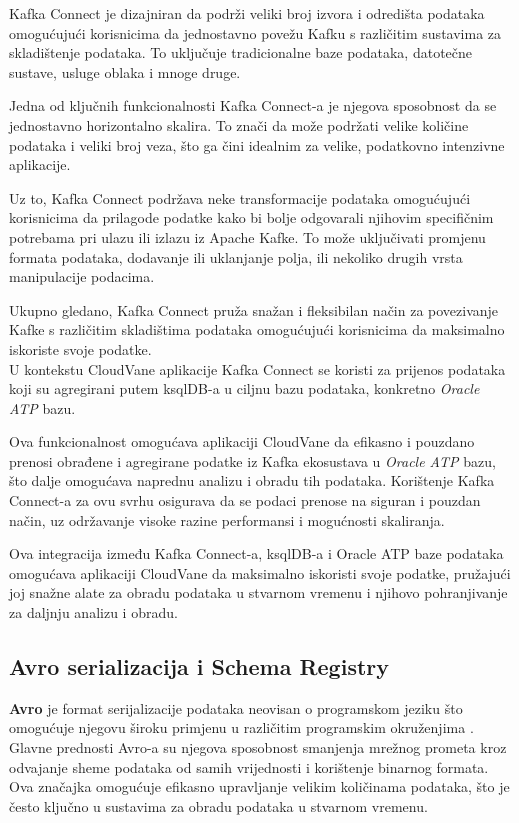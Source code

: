 \documentclass[times, utf8, diplomski]{fer}
\begin{document}
Kafka Connect je dizajniran da podrži veliki broj izvora  i odredišta  podataka omogućujući korisnicima da jednostavno povežu Kafku s različitim sustavima za skladištenje podataka. To uključuje tradicionalne baze podataka, datotečne sustave, usluge oblaka i mnoge druge.

Jedna od ključnih funkcionalnosti Kafka Connect-a je njegova sposobnost da se jednostavno horizontalno skalira. To znači da može podržati velike količine podataka i veliki broj veza, što ga čini idealnim za velike, podatkovno intenzivne aplikacije.

Uz to, Kafka Connect podržava neke transformacije podataka omogućujući korisnicima da prilagode podatke kako bi bolje odgovarali njihovim specifičnim potrebama pri ulazu ili izlazu iz Apache Kafke. To može uključivati promjenu formata podataka, dodavanje ili uklanjanje polja, ili nekoliko drugih vrsta manipulacije podacima.

Ukupno gledano, Kafka Connect pruža snažan i fleksibilan način za povezivanje Kafke s različitim skladištima podataka omogućujući korisnicima da maksimalno iskoriste svoje podatke. \\

U kontekstu CloudVane aplikacije Kafka Connect se koristi za prijenos podataka koji su agregirani putem ksqlDB-a u ciljnu bazu podataka, konkretno \emph{Oracle ATP}  bazu.

Ova funkcionalnost omogućava aplikaciji CloudVane da efikasno i pouzdano prenosi obrađene i agregirane podatke iz Kafka ekosustava u \emph{Oracle ATP} bazu, što dalje omogućava naprednu analizu i obradu tih podataka. Korištenje Kafka Connect-a za ovu svrhu osigurava da se podaci prenose na siguran i pouzdan način, uz održavanje visoke razine performansi i mogućnosti skaliranja.

Ova integracija između Kafka Connect-a, ksqlDB-a i Oracle ATP baze podataka omogućava aplikaciji CloudVane da maksimalno iskoristi svoje podatke, pružajući joj snažne alate za obradu podataka u stvarnom vremenu i njihovo pohranjivanje za daljnju analizu i obradu.

\clearpage
\subsection{Avro serializacija i Schema Registry}
\label{sec:schema}

\textbf{Avro} je format serijalizacije podataka neovisan o programskom jeziku što omogućuje njegovu široku primjenu u različitim programskim okruženjima \citep{shapira_kafka_2021}. Glavne prednosti Avro-a su njegova sposobnost smanjenja mrežnog prometa kroz odvajanje sheme podataka od samih vrijednosti i korištenje binarnog formata. Ova značajka omogućuje efikasno upravljanje velikim količinama podataka, što je često ključno u sustavima za obradu podataka u stvarnom vremenu.
\end{document}
